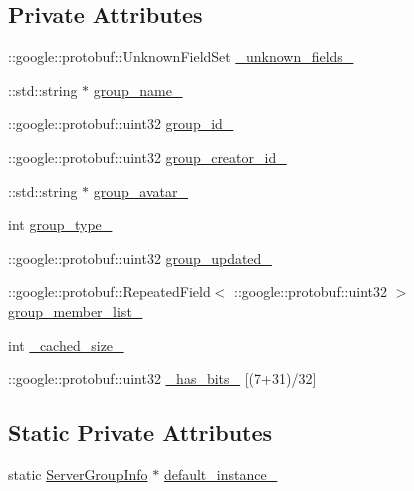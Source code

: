 \subsection*{Private Attributes}
\begin{DoxyCompactItemize}
\item 
\+::google\+::protobuf\+::\+Unknown\+Field\+Set \hyperlink{class_i_m_1_1_base_define_1_1_server_group_info_a24edb083ba40d81214a10eb3004005f4}{\+\_\+unknown\+\_\+fields\+\_\+}
\item 
\+::std\+::string $\ast$ \hyperlink{class_i_m_1_1_base_define_1_1_server_group_info_af9eba287461ef0ea4f7d54e8b51fa777}{group\+\_\+name\+\_\+}
\item 
\+::google\+::protobuf\+::uint32 \hyperlink{class_i_m_1_1_base_define_1_1_server_group_info_adeeaf1dd0cceb8be57fe35aa83728d74}{group\+\_\+id\+\_\+}
\item 
\+::google\+::protobuf\+::uint32 \hyperlink{class_i_m_1_1_base_define_1_1_server_group_info_a4830156900a8957767defb9c80de2ab6}{group\+\_\+creator\+\_\+id\+\_\+}
\item 
\+::std\+::string $\ast$ \hyperlink{class_i_m_1_1_base_define_1_1_server_group_info_a1e277c37cedcdb536633d0ec35f75ac8}{group\+\_\+avatar\+\_\+}
\item 
int \hyperlink{class_i_m_1_1_base_define_1_1_server_group_info_a150ea73e4a1855e80aae1f1a6c6e35cb}{group\+\_\+type\+\_\+}
\item 
\+::google\+::protobuf\+::uint32 \hyperlink{class_i_m_1_1_base_define_1_1_server_group_info_a2dbc377e86964527547a32577772c5b5}{group\+\_\+updated\+\_\+}
\item 
\+::google\+::protobuf\+::\+Repeated\+Field$<$ \+::google\+::protobuf\+::uint32 $>$ \hyperlink{class_i_m_1_1_base_define_1_1_server_group_info_a804fa7a42b9fe58109048a020dbe0cc3}{group\+\_\+member\+\_\+list\+\_\+}
\item 
int \hyperlink{class_i_m_1_1_base_define_1_1_server_group_info_a08b695549fbb4c20f22b088b58b8394c}{\+\_\+cached\+\_\+size\+\_\+}
\item 
\+::google\+::protobuf\+::uint32 \hyperlink{class_i_m_1_1_base_define_1_1_server_group_info_aa98e9b9de08821af3f2c6d873ce2022e}{\+\_\+has\+\_\+bits\+\_\+} \mbox{[}(7+31)/32\mbox{]}
\end{DoxyCompactItemize}
\subsection*{Static Private Attributes}
\begin{DoxyCompactItemize}
\item 
static \hyperlink{class_i_m_1_1_base_define_1_1_server_group_info}{Server\+Group\+Info} $\ast$ \hyperlink{class_i_m_1_1_base_define_1_1_server_group_info_ab4b389e053ff15e65239d9e88d083eb8}{default\+\_\+instance\+\_\+}
\end{DoxyCompactItemize}

